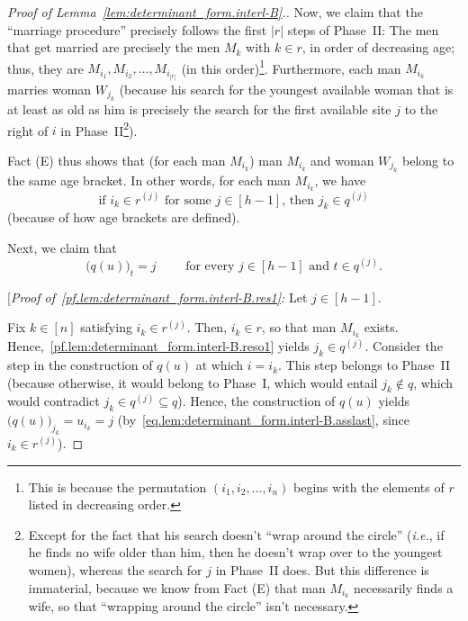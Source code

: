 \documentclass[reqno]{amsart}
\newcommand{\0}{\phantom{c}}
\newcommand{\abs}[1]{\left| #1 \right|}
\newcommand{\tup}[1]{\left( #1 \right)}
\newcommand{\ive}[1]{\left[ #1 \right]}
\theoremstyle{plain}
\theoremstyle{definition}
\numberwithin{equation}{section}
\begin{document}
\begin{proof}[Proof of Lemma~\ref{lem:determinant_form.interl-B}.]
Now, we claim that the ``marriage procedure'' precisely follows the first $\abs{r}$ steps of Phase~II:
The men that get married are precisely the men $M_k$ with $k \in r$, in order of decreasing age; thus, they are $M_{i_1}, M_{i_2}, \ldots, M_{i_{\abs{r}}}$ (in this order)\footnote{This is because the permutation $\tup{i_1, i_2, \ldots, i_n}$ begins with the elements of $r$ listed in decreasing order.}.
Furthermore, each man $M_{i_k}$ marries woman $W_{j_k}$ (because his search for the youngest available woman that is at least as old as him is precisely the search for the first available site $j$ to the right of $i$ in Phase~II\footnote{Except for the fact that his search doesn't ``wrap around the circle'' (\textit{i.e.}, if he finds no wife older than him, then he doesn't wrap over to the youngest women), whereas the search for $j$ in Phase~II does. But this difference is immaterial, because we know from Fact (E) that man $M_{i_k}$ necessarily finds a wife, so that ``wrapping around the circle'' isn't necessary.}).

Fact (E) thus shows that (for each man $M_{i_k}$) man $M_{i_k}$ and woman $W_{j_k}$ belong to the same age bracket.
In other words, for each man $M_{i_k}$, we have
\begin{equation}
\label{pf.lem:determinant_form.interl-B.reso1}
\text{if $i_k \in r^{(j)}$ for some $j \in \ive{h-1}$, then $j_k \in q^{(j)}$}
\end{equation}
(because of how age brackets are defined).

Next, we claim that
\begin{equation}
\label{pf.lem:determinant_form.interl-B.res1}
\bigl( q(u) \bigr)_t = j
\qquad \text{ for every } j \in \ive{h-1} \text{ and } t \in q^{(j)} .
\end{equation}

[\textit{Proof of~\eqref{pf.lem:determinant_form.interl-B.res1}:}
Let $j \in \ive{h-1}$.

Fix $k \in \ive{n}$ satisfying $i_k \in r^{(j)}$.
Then, $i_k \in r$, so that man $M_{i_k}$ exists.
Hence,~\eqref{pf.lem:determinant_form.interl-B.reso1} yields $j_k \in q^{(j)}$.
Consider the step in the construction of $q(u)$ at which $i = i_k$.
This step belongs to Phase~II (because otherwise, it would belong to Phase~I,
which would entail $j_k \notin q$, which would contradict $j_k \in q^{(j)} \subseteq q$).
Hence, the construction of $q(u)$ yields $\bigl( q(u) \bigr)_{j_k} = u_{i_k} = j$
(by~\eqref{eq.lem:determinant_form.interl-B.asslast}, since $i_k \in r^{(j)}$).


\end{proof}
\end{document}
